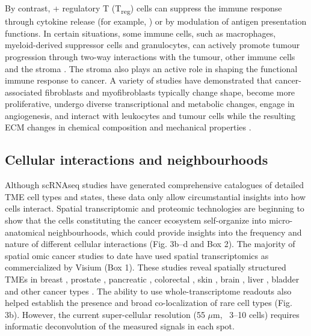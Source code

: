 By contrast, + regulatory T (T\textsubscript{reg}) cells can suppress the immune response through cytokine release (for example, ) or by modulation of antigen presentation functions. In certain situations, some immune cells, such as macrophages, myeloid-derived suppressor cells and granulocytes, can actively promote tumour progression through two-way interactions with the tumour, other immune cells and the stroma \parencite{Goswami2023-qv,Murdoch2008-cu,DeNardo2019-tk}. The stroma also plays an active role in shaping the functional immune response to cancer. A variety of studies have demonstrated that cancer-associated fibroblasts and myofibroblasts typically change shape, become more proliferative, undergo diverse transcriptional and metabolic changes, engage in angiogenesis, and interact with leukocytes and tumour cells while the resulting \ac{ECM} changes in chemical composition and mechanical properties \parencite{Valkenburg2018-kn,Kalluri2016-xz,Lendahl2022-sx,Sahai2020-ok,Davidson2020-rc}.

\subsection*{Cellular interactions and neighbourhoods}

Although \ac{scRNAseq} studies have generated comprehensive catalogues of detailed TME cell types and states, these data only allow circumstantial insights into how cells interact. Spatial transcriptomic and proteomic technologies are beginning to show that the cells constituting the cancer ecosystem self-organize into micro-anatomical neighbourhoods, which could provide insights into the frequency and nature of different cellular interactions (Fig. 3b–d and Box 2). The majority of spatial omic cancer studies to date have used spatial transcriptomics as commercialized by \ac{Visium} (Box 1). These studies reveal spatially structured TMEs in breast \parencite{Stahl2016-nq,Wu2021-uq,Andersson2021-pu}, prostate \parencite{Berglund2018-gh}, pancreatic \parencite{Moncada2020-ck}, colorectal \parencite{Qi2022-by}, skin \parencite{Ji2020-gn}, brain \parencite{Ravi2022-ut}, liver \parencite{Wu2021-wb}, bladder \parencite{Gouin2021-zx} and other cancer types \parencite{Erickson2022-zh,Barkley2022-gx}. The ability to use whole-transcriptome readouts also helped establish the presence and broad co-localization of rare cell types (Fig. 3b). However, the current super-cellular resolution (55 $\mu$m, ~3–10 cells) requires informatic deconvolution of the measured signals in each spot.

